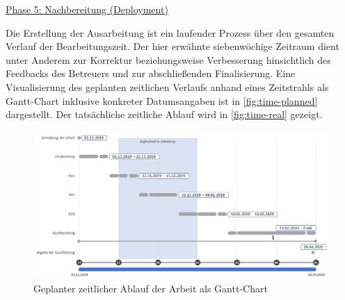 \underline{Phase 5: Nachbereitung (Deployment)}
\begin{table}[H]
\label{tab:phase5}
\end{table}

Die Erstellung der Ausarbeitung ist ein laufender Prozess über den gesamten Verlauf der Bearbeitungszeit. Der hier erwähnte siebenwöchige Zeitraum dient unter Anderem zur Korrektur beziehungsweise Verbesserung hinsichtlich des Feedbacks des Betreuers und zur abschließenden Finalisierung. Eine Visualisierung des geplanten zeitlichen Verlaufs anhand eines Zeitstrahls als Gantt-Chart inklusive konkreter Datumsangaben ist in \autoref{fig:time-planned} dargestellt. Der tatsächliche zeitliche Ablauf wird in \autoref{fig:time-real} gezeigt.

\begin{figure}[H]
    \centering
    \includegraphics[width=\textwidth]{images/Zeit}
    \caption{Geplanter zeitlicher Ablauf der Arbeit als Gantt-Chart}\label{fig:time-planned}
\end{figure}


